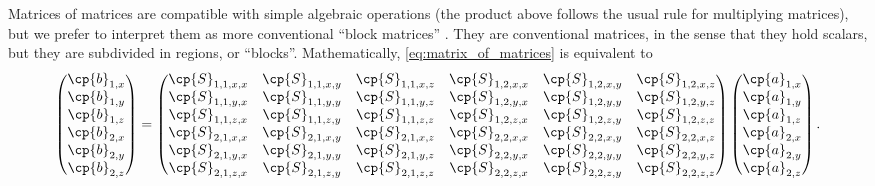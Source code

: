 \begin{refsection}
Matrices of matrices are compatible with simple algebraic operations (the product above follows the usual rule for multiplying matrices), but we prefer to interpret them as more conventional ``block matrices'' \parencite{eves2012elementary}.
They are conventional matrices, in the sense that they hold scalars, but they are subdivided in regions, or ``blocks''.
Mathematically, \cref{eq:matrix_of_matrices} is equivalent to
\begin{equation}
    \begin{pmatrix}
        \cp{b}_{1, x} \\ \cp{b}_{1, y} \\ \cp{b}_{1, z}
        \\
        \cp{b}_{2, x} \\ \cp{b}_{2, y} \\ \cp{b}_{2, z}
    \end{pmatrix}
    =
    \begin{pmatrix}
        \cp{S}_{1, 1, x, x} & \cp{S}_{1, 1, x, y} & \cp{S}_{1, 1, x, z}   &   \cp{S}_{1, 2, x, x} & \cp{S}_{1, 2, x, y} & \cp{S}_{1, 2, x, z} \\
        \cp{S}_{1, 1, y, x} & \cp{S}_{1, 1, y, y} & \cp{S}_{1, 1, y, z}   &   \cp{S}_{1, 2, y, x} & \cp{S}_{1, 2, y, y} & \cp{S}_{1, 2, y, z} \\
        \cp{S}_{1, 1, z, x} & \cp{S}_{1, 1, z, y} & \cp{S}_{1, 1, z, z}   &   \cp{S}_{1, 2, z, x} & \cp{S}_{1, 2, z, y} & \cp{S}_{1, 2, z, z} \\
        \cp{S}_{2, 1, x, x} & \cp{S}_{2, 1, x, y} & \cp{S}_{2, 1, x, z}   &   \cp{S}_{2, 2, x, x} & \cp{S}_{2, 2, x, y} & \cp{S}_{2, 2, x, z} \\
        \cp{S}_{2, 1, y, x} & \cp{S}_{2, 1, y, y} & \cp{S}_{2, 1, y, z}   &   \cp{S}_{2, 2, y, x} & \cp{S}_{2, 2, y, y} & \cp{S}_{2, 2, y, z} \\
        \cp{S}_{2, 1, z, x} & \cp{S}_{2, 1, z, y} & \cp{S}_{2, 1, z, z}   &   \cp{S}_{2, 2, z, x} & \cp{S}_{2, 2, z, y} & \cp{S}_{2, 2, z, z}
    \end{pmatrix}
    \begin{pmatrix}
        \cp{a}_{1, x} \\ \cp{a}_{1, y} \\ \cp{a}_{1, z}
        \\
        \cp{a}_{2, x} \\ \cp{a}_{2, y} \\ \cp{a}_{2, z}
    \end{pmatrix}
    \text{.}
    \label{eq:matrix_flattenned}

\end{equation}
\end{refsection}
